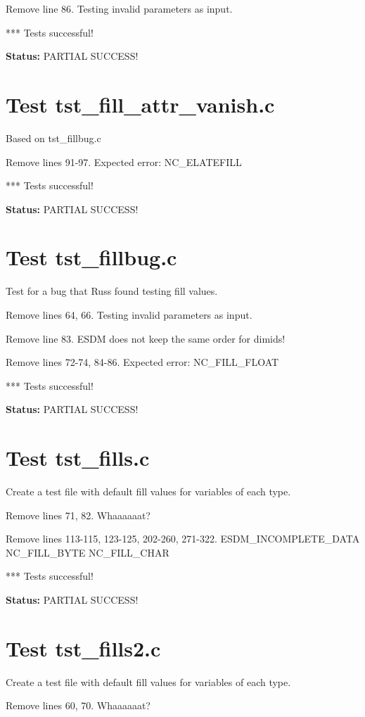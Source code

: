 Remove line 86. Testing invalid parameters as input.

*** Tests successful!

{\bf \large Status: } PARTIAL SUCCESS!

\section{Test tst\_fill\_attr\_vanish.c}

Based on tst\_fillbug.c

Remove lines 91-97. Expected error: NC\_ELATEFILL

*** Tests successful!

{\bf \large Status: } PARTIAL SUCCESS!

\section{Test tst\_fillbug.c}

Test for a bug that Russ found testing fill values.

Remove lines 64, 66. Testing invalid parameters as input.

Remove line 83. ESDM does not keep the same order for dimids!

Remove lines 72-74, 84-86. Expected error: NC\_FILL\_FLOAT

*** Tests successful!

{\bf \large Status: } PARTIAL SUCCESS!

\section{Test tst\_fills.c}

Create a test file with default fill values for variables of each type.

Remove lines 71, 82. Whaaaaaat?

Remove lines 113-115, 123-125, 202-260, 271-322. ESDM\_INCOMPLETE\_DATA NC\_FILL\_BYTE NC\_FILL\_CHAR

*** Tests successful!

{\bf \large Status: } PARTIAL SUCCESS!

\section{Test tst\_fills2.c}

Create a test file with default fill values for variables of each type.

Remove lines 60, 70. Whaaaaaat?

